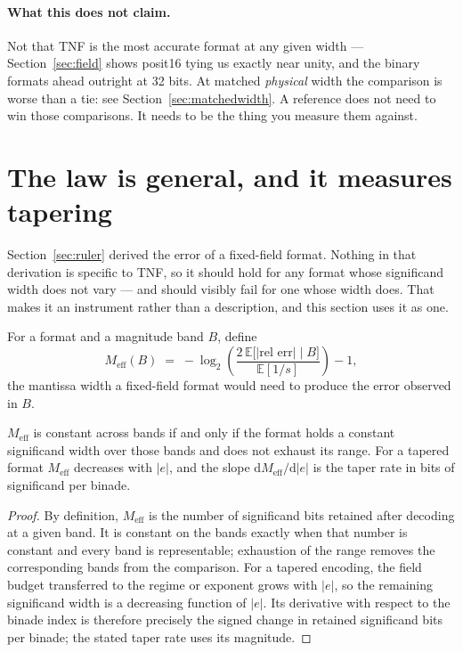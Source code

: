 \paragraph{What this does not claim.} Not that TNF is the most accurate format
at any given width --- Section~\ref{sec:field} shows posit16 tying us exactly
near unity, and the binary formats ahead outright at 32 bits. At matched
\emph{physical} width the comparison is worse than a tie: see
Section~\ref{sec:matchedwidth}. A reference does not need to win those comparisons. It needs to be the
thing you measure them against.


\section{The law is general, and it measures tapering}\label{sec:law}

Section~\ref{sec:ruler} derived the error of a fixed-field format. Nothing in that
derivation is specific to TNF, so it should hold for any format whose significand
width does not vary --- and should visibly fail for one whose width does. That
makes it an instrument rather than a description, and this section uses it as one.

\begin{definition}
For a format and a magnitude band $B$, define
\[
  M_{\mathrm{eff}}(B) \;=\; -\log_2\!\left(\frac{2\,\mathbb{E}\bigl[|\text{rel err}|\;\big|\;B\bigr]}{\mathbb{E}[1/s]}\right) - 1 ,
\]
the mantissa width a fixed-field format would need to produce the error observed
in $B$.
\end{definition}

\begin{theorem}[Diagnostic]\label{thm:diag}
$M_{\mathrm{eff}}$ is constant across bands if and only if the format holds a
constant significand width over those bands and does not exhaust its range. For a
tapered format $M_{\mathrm{eff}}$ decreases with $|e|$, and the slope
$\mathrm{d}M_{\mathrm{eff}}/\mathrm{d}|e|$ is the taper rate in bits of
significand per binade.
\end{theorem}
\begin{proof}
By definition, $M_{\mathrm{eff}}$ is the number of significand bits retained
after decoding at a given band. It is constant on the bands exactly when that
number is constant and every band is representable; exhaustion of the range
removes the corresponding bands from the comparison. For a tapered encoding,
the field budget transferred to the regime or exponent grows with $|e|$, so the
remaining significand width is a decreasing function of $|e|$. Its derivative
with respect to the binade index is therefore precisely the signed change in
retained significand bits per binade; the stated taper rate uses its magnitude.
\end{proof}

